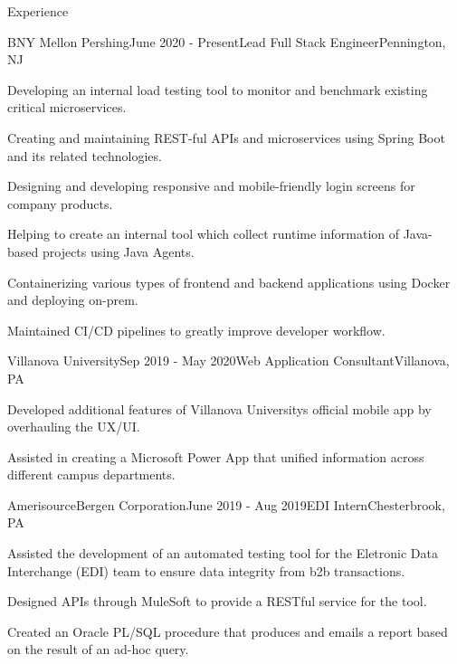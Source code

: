 \documentclass[
	11pt, %
]{resume} %
\begin{document}
\begin{rSection}{Experience}

	\begin{rSubsection}{BNY Mellon \textbar{} Pershing}{June 2020 - Present}{Lead Full Stack Engineer}{Pennington, NJ}
		\item Developing an internal load testing tool to monitor and benchmark existing critical microservices.
		\item Creating and maintaining REST-ful APIs and microservices using Spring Boot and its related technologies.
		\item Designing and developing responsive and mobile-friendly login screens for company products.
		\item Helping to create an internal tool which collect runtime information of Java-based projects using Java Agents.
		\item Containerizing various types of frontend and backend applications using Docker and deploying on-prem.
		\item Maintained CI/CD pipelines to greatly improve developer workflow.
	\end{rSubsection}


	\begin{rSubsection}{Villanova University}{Sep 2019 - May 2020}{Web Application Consultant}{Villanova, PA}
		\item Developed additional features of Villanova University\textquotesingle{}s official mobile app by overhauling the UX/UI.
		\item Assisted in creating a Microsoft Power App that unified information across different campus departments.
	\end{rSubsection}


	\begin{rSubsection}{AmerisourceBergen Corporation}{June 2019 - Aug 2019}{EDI Intern}{Chesterbrook, PA}
		\item Assisted the development of an automated testing tool for the Eletronic Data Interchange (EDI) team to ensure data integrity from b2b transactions.
		\item Designed APIs through MuleSoft to provide a RESTful service for the tool.
		\item Created an Oracle PL/SQL procedure that produces and emails a report based on the result of an ad-hoc query.
	\end{rSubsection}


\end{rSection}
\end{document}
